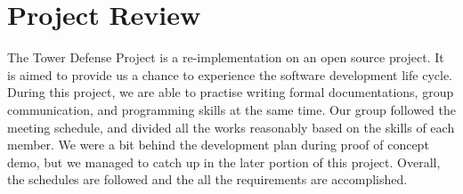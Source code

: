 \documentclass[12pt]{article}
\begin{document}
\section{Project Review}
\color{red}
The Tower Defense Project is a re-implementation on an open source project. It is aimed to provide us a chance to experience the software development life cycle. During this project, we are able to practise writing formal documentations, group communication, and programming skills at the same time. Our group followed the meeting schedule, and divided all the works reasonably based on the skills of each member. We were a bit behind the development plan during proof of concept demo, but we managed to catch up in the later portion of this project. Overall, the schedules are followed and the all the requirements are accomplished.
\color{black}
\end{document}
